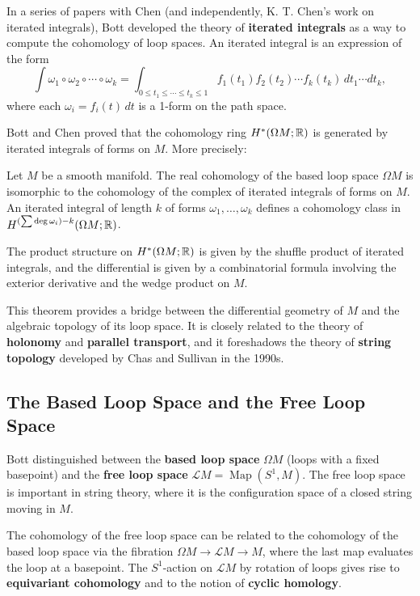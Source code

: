 In a series of papers with Chen (and independently, K. T. Chen's work on iterated integrals), Bott developed the theory of \textbf{iterated integrals} as a way to compute the cohomology of loop spaces. An iterated integral is an expression of the form
\[
\int \omega_1 \circ \omega_2 \circ \cdots \circ \omega_k = \int_{0 \leq t_1 \leq \cdots \leq t_k \leq 1} f_1(t_1) f_2(t_2) \cdots f_k(t_k) \, dt_1 \cdots dt_k,
\]
where each \(\omega_i = f_i(t) \, dt\) is a 1-form on the path space.

Bott and Chen proved that the cohomology ring \(H^*(\Omega M; \mathbb{R})\) is generated by iterated integrals of forms on \(M\). More precisely:

\begin{theorem}
Let \(M\) be a smooth manifold. The real cohomology of the based loop space \(\Omega M\) is isomorphic to the cohomology of the complex of iterated integrals of forms on \(M\). An iterated integral of length \(k\) of forms \(\omega_1, \dots, \omega_k\) defines a cohomology class in \(H^{(\sum \deg \omega_i) - k}(\Omega M; \mathbb{R})\).

The product structure on \(H^*(\Omega M; \mathbb{R})\) is given by the shuffle product of iterated integrals, and the differential is given by a combinatorial formula involving the exterior derivative and the wedge product on \(M\).
\end{theorem}

This theorem provides a bridge between the differential geometry of \(M\) and the algebraic topology of its loop space. It is closely related to the theory of \textbf{holonomy} and \textbf{parallel transport}, and it foreshadows the theory of \textbf{string topology} developed by Chas and Sullivan in the 1990s.

\subsection{The Based Loop Space and the Free Loop Space}

Bott distinguished between the \textbf{based loop space} \(\Omega M\) (loops with a fixed basepoint) and the \textbf{free loop space} \(\mathcal{L}M = \operatorname{Map}(S^1, M)\). The free loop space is important in string theory, where it is the configuration space of a closed string moving in \(M\).

The cohomology of the free loop space can be related to the cohomology of the based loop space via the fibration \(\Omega M \to \mathcal{L}M \to M\), where the last map evaluates the loop at a basepoint. The \(S^1\)-action on \(\mathcal{L}M\) by rotation of loops gives rise to \textbf{equivariant cohomology} and to the notion of \textbf{cyclic homology}.


